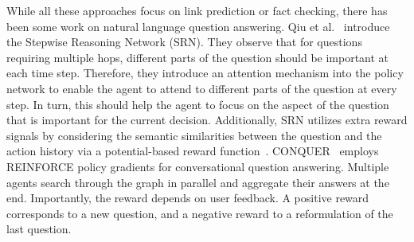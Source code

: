 While all these approaches focus on link prediction or fact checking, there has been some work on natural language question answering.
Qiu et al.~\cite{Qiu2020Stepwise} introduce the Stepwise Reasoning Network (SRN).
They observe that for questions requiring multiple hops, different parts of the question should be important at each time step. Therefore, they introduce an attention mechanism into the policy network to enable the agent to attend to different parts of the question at every step. In turn, this should help the agent to focus on the aspect of the question that is important for the current decision. Additionally, SRN utilizes extra reward signals by considering the semantic similarities between the question and the action history via a potential-based reward function~\cite{Ng1999Potential}. CONQUER~\cite{Kaiser2021Reinforcement} employs REINFORCE policy gradients for conversational question answering. Multiple agents search through the graph in parallel and aggregate their answers at the end. Importantly, the reward depends on user feedback. A positive reward corresponds to a new question, and a negative reward to a reformulation of the last question.






